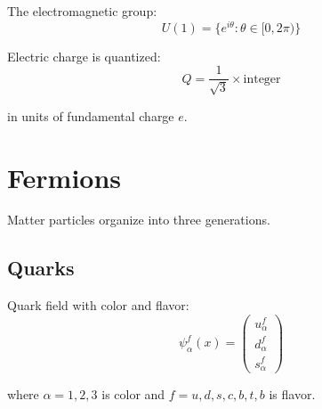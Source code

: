 \begin{definition}
\label{def:u1}
The electromagnetic group:
\begin{equation}
U(1) = \{e^{i\theta} : \theta \in [0,2\pi)\}
\end{equation}
\end{definition}

\begin{proposition}
\label{prop:u1-charge}
Electric charge is quantized:
\begin{equation}
Q = \frac{1}{\sqrt{3}} \times \text{integer}
\end{equation}

in units of fundamental charge $e$.
\end{proposition}

\section{Fermions}

Matter particles organize into three generations.

\subsection{Quarks}

\begin{definition}
\label{def:quark}
Quark field with color and flavor:
\begin{equation}
\psi_{\alpha}^f(x) = \begin{pmatrix}u_\alpha^f \\ d_\alpha^f \\ s_\alpha^f\end{pmatrix}
\end{equation}

where $\alpha = 1,2,3$ is color and $f = u,d,s,c,b,t,b$ is flavor.
\end{definition}

\begin{table}[h]
\centering
\caption{Quark Properties}
\end{table}

